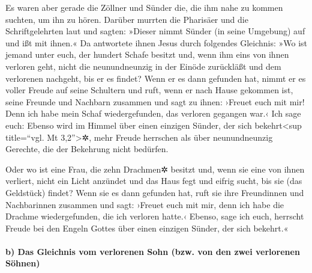  Es waren aber gerade die Zöllner und Sünder die, die ihm
nahe zu kommen suchten, um ihn zu hören.  Darüber murrten
die Pharisäer und die Schriftgelehrten laut und sagten: »Dieser nimmt
Sünder (in seine Umgebung) auf und ißt mit ihnen.«  Da
antwortete ihnen Jesus durch folgendes Gleichnis:  »Wo ist
jemand unter euch, der hundert Schafe besitzt und, wenn ihm eins von
ihnen verloren geht, nicht die neunundneunzig in der Einöde zurückläßt
und dem verlorenen nachgeht, bis er es findet?  Wenn er es
dann gefunden hat, nimmt er es voller Freude auf seine Schultern
 und ruft, wenn er nach Hause gekommen ist, seine Freunde
und Nachbarn zusammen und sagt zu ihnen: ›Freuet euch mit mir! Denn ich
habe mein Schaf wiedergefunden, das verloren gegangen war.‹
 Ich sage euch: Ebenso wird im Himmel über einen einzigen
Sünder, der sich bekehrt\textless sup title=``vgl. Mt
3,2''\textgreater✲, mehr Freude herrschen als über neunundneunzig
Gerechte, die der Bekehrung nicht bedürfen.

 Oder wo ist eine Frau, die zehn Drachmen✲ besitzt und,
wenn sie eine von ihnen verliert, nicht ein Licht anzündet und das Haus
fegt und eifrig sucht, bis sie (das Geldstück) findet? 
Wenn sie es dann gefunden hat, ruft sie ihre Freundinnen und
Nachbarinnen zusammen und sagt: ›Freuet euch mit mir, denn ich habe die
Drachme wiedergefunden, die ich verloren hatte.‹  Ebenso,
sage ich euch, herrscht Freude bei den Engeln Gottes über einen einzigen
Sünder, der sich bekehrt.«

\hypertarget{b-das-gleichnis-vom-verlorenen-sohn-bzw.-von-den-zwei-verlorenen-suxf6hnen}{%
\paragraph{b) Das Gleichnis vom verlorenen Sohn (bzw. von den zwei
verlorenen
Söhnen)}\label{b-das-gleichnis-vom-verlorenen-sohn-bzw.-von-den-zwei-verlorenen-suxf6hnen}}

